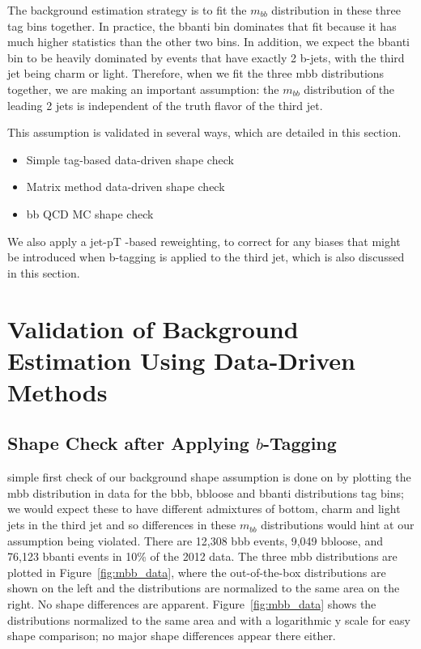  The background estimation strategy is to fit the $m_{bb}$ distribution in these three tag bins together. In
 practice, the bbanti bin dominates that fit because it has much higher statistics than the other two bins. In
 addition, we expect the bbanti bin to be heavily dominated by events that have exactly 2 b-jets, with the
 third jet being charm or light. Therefore, when we fit the three mbb distributions together, we are making
 an important assumption: the $m_{bb}$ distribution of the leading 2 jets is independent of the truth flavor of the third jet.

This assumption is validated in several ways, which are detailed in this section.
\begin{itemize}
    \item Simple tag-based data-driven shape check
    \item Matrix method data-driven shape check
    \item bb QCD MC shape check
\end{itemize}
 We also apply a jet-pT -based reweighting, to correct for any biases that might be introduced when
 b-tagging is applied to the third jet, which is also discussed in this section.


\section{Validation of Background Estimation Using Data-Driven Methods}
\subsection{Shape Check after Applying $b$-Tagging}
 simple first check of our background shape assumption is done on by plotting the mbb distribution
 in data for the bbb, bbloose and bbanti distributions tag bins; we would expect these to have different
 admixtures of bottom, charm and light jets in the third jet and so differences in these $m_{bb}$ distributions
 would hint at our assumption being violated. There are 12,308 bbb events, 9,049 bbloose, and 76,123
 bbanti events in 10\% of the 2012 data. The three mbb distributions are plotted in Figure~\ref{fig:mbb_data}, where the
 out-of-the-box distributions are shown on the left and the distributions are normalized to the same area
 on the right. No shape differences are apparent. Figure~\ref{fig:mbb_data} shows the distributions normalized to the
 same area and with a logarithmic y scale for easy shape comparison; no major shape differences appear
 there either.

